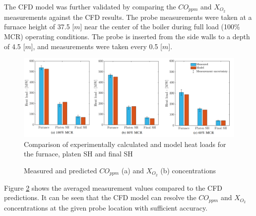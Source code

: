 \documentclass[twocolumn,10pt]{asme2ej}
\begin{document}
The CFD model was further validated by comparing the $CO_{ppm}$ and $X_{O_{2}}$ measurements against the CFD results. The probe measurements were taken at a furnace height of 37.5 [$m$] near the center of the boiler during full load (100\% MCR) operating conditions. The probe is inserted from the side walls to a depth of 4.5 [$m$], and measurements were taken every 0.5 [$m$].\\

\begin{figure}[h]
\centerline{\includegraphics[scale = 0.4]{VALIDATION}}
\caption{Comparison of experimentally calculated and model heat loads for the furnace, platen SH and final SH}
\label{fig_heat_valid}
\end{figure}
\begin{figure}[h!]
\centering
{}
\hspace{5mm}
\caption{Measured and predicted $CO_{ppm}$ (a) and $X_{O_{2}}$ (b) concentrations}
\label{fig_probe_valid}
\end{figure}
Figure \ref{fig_probe_valid} shows the averaged measurement values compared to the CFD predictions. It can be seen that the CFD model can resolve the $CO_{ppm}$ and $X_{O_{2}}$ concentrations at the given probe location with sufficient accuracy.
\end{document}
